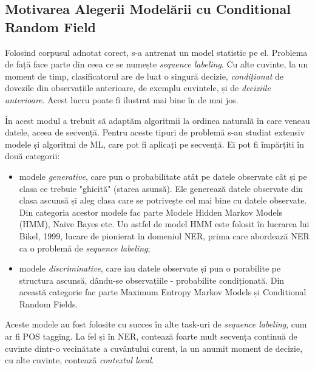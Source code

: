 \subsection{Motivarea Alegerii Modelării cu Conditional Random Field}

Folosind corpusul adnotat corect, s-a antrenat un model statistic pe el. Problema de față face parte din ceea ce se numește \textit{sequence labeling}. Cu alte cuvinte, la un moment de timp, clasificatorul are de luat o singură decizie, \textit{condiționat} de dovezile din observațiile anterioare, de exemplu cuvintele, și de \textit{deciziile anterioare}. Acest lucru poate fi ilustrat mai bine în  de mai jos. 



În acest modul a trebuit să adaptăm algoritmii la ordinea naturală în care veneau datele, aceea de secvență. Pentru aceste tipuri de problemă s-au studiat extensiv modele și algoritmi de ML, care pot fi aplicați pe secvență. Ei pot fi împărțiti în două categorii:

\begin{itemize}
\item modele \textit{generative}, care pun o probabilitate atât pe datele observate cât și pe clasa ce trebuie "ghicită" (starea asunsă). Ele generează datele observate din clasa ascunsă și aleg clasa care se potrivește cel mai bine cu datele observate. Din categoria acestor modele fac parte Modele Hidden Markov Models (HMM), Naive Bayes etc. Un astfel de model HMM este folosit în lucrarea lui Bikel, 1999, lucare de pionierat în domeniul NER, prima care abordează NER ca o problemă de \textit{sequence labeling}\cite{Bikel99analgorithm};
\item modele \textit{discriminative}, care iau datele observate și pun o porabilite pe structura ascunsă, dându-se observațiile - probabilite condiționată. Din această categorie fac parte Maximum Entropy Markov Models și Conditional Random Fields.\cite{Mccallum00maximumentropy}\cite{Lafferty01conditionalrandom}
\end{itemize}

Aceste modele au fost folosite cu succes în alte task-uri de \textit{sequence labeling}, cum ar fi POS tagging. La fel și în NER, contează foarte mult secvența continuă de cuvinte dintr-o vecinătate a cuvântului curent, la un anumit moment de decizie, cu alte cuvinte, contează \textit{contextul local}.


